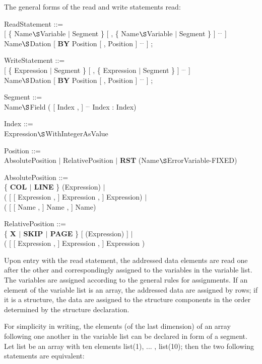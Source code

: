 The general forms of the read and write statements read:

ReadStatement ::= \\
 [ \{ Name$\S $Variable $\mid$ Segment \} [ , \{ Name$\S $Variable $\mid$ Segment \} ] $^{...}$ ]\\
 Name$\S $Dation [ {\bf BY} Position [ , Position ] $^{...}$ ] ;

WriteStatement ::=\\
 [ \{ Expression $\mid$ Segment \} [ , \{ Expression $\mid$ Segment \} ] $^{...}$ ]\\
 Name$\S $Dation [ {\bf BY} Position [ , Position ] $^{...}$ ] ;

Segment ::= \\
\x Name$\S $Field ( [ Index , ] $^{...}$ Index : Index)

Index ::=\\
\x Expression$\S $WithIntegerAsValue

Position ::= \\
\x AbsolutePosition $\mid$ RelativePosition $\mid$ {\bf RST} (Name$\S $ErrorVariable-FIXED)

AbsolutePosition ::=\\
\x \{ {\bf COL $\mid$ LINE} \} (Expression) $\mid$\\
 ( [ [ Expression , ] Expression , ] Expression) $\mid$ \\
 ( [ [ Name , ] Name , ] Name)

RelativePosition ::=\\
\x \{ {\bf X $\mid$ SKIP $\mid$ PAGE} \} [ (Expression) ] $\mid$ \\
 ( [ [ Expression , ] Expression , ] Expression )

Upon entry with the read statement, the addressed data elements are
read one after the other and correspondingly assigned to the variables
in the variable list. The variables are assigned according to the
general rules for assignments. If an element of the variable list is an
array, the addressed data are assigned by rows; if it is a structure, the
data are assigned to the structure components in the order determined by
the structure declaration.

For simplicity in writing, the elements (of the last dimension) of an
array following one another in the variable list can be declared in form
of a segment. Let list be an array with ten elements list(1), ... ,
list(10); then the two following statements are equivalent:

